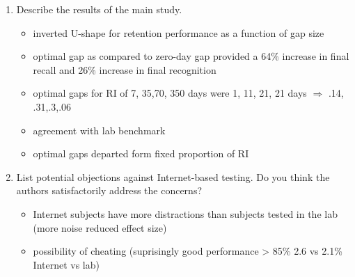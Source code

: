 \documentclass[12pt,english]{scrartcl}
\begin{document}
\begin{enumerate}
 \item Describe the results of the main study.

 \color{blue}
 \begin{itemize}
 \item inverted U-shape for retention performance as a function of gap size
 \item optimal gap as compared to zero-day gap provided a 64\% increase in final recall and 26\% increase in final recognition
 \item optimal gaps for RI of 7, 35,70, 350 days were 1, 11, 21, 21 days $\Rightarrow$ .14, .31,.3,.06
 \item agreement with lab benchmark
 \item optimal gaps departed form fixed proportion of RI

\end{itemize}
  \color{black}


\item List potential objections against Internet-based testing. Do you think the authors satisfactorily address the concerns?
 \color{blue}
 \begin{itemize}
 \item Internet subjects have more distractions than subjects tested in the lab (more noise reduced effect size)
 \item possibility of cheating (suprisingly good performance > 85\% 2.6 vs 2.1\% Internet vs lab)
\end{itemize}
  \color{black}
 
\end{enumerate}
\end{document}
